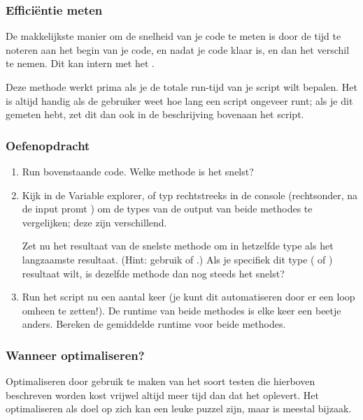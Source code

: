 \documentclass[a4paper,11pt, fleqn]{article}
\begin{document}
\subsubsection{Effici\"entie meten}
De makkelijkste manier om de snelheid van je code te meten is door de tijd te noteren aan het begin van je code, en nadat je code klaar is, en dan het verschil te nemen. Dit kan intern met het .


Deze methode werkt prima als je de totale run-tijd van je script wilt bepalen. Het is altijd handig als de gebruiker weet hoe lang een script ongeveer runt; als je dit gemeten hebt, zet dit dan ook in de beschrijving bovenaan het script.

\subsubsection*{Oefenopdracht}
\begin{enumerate}[label=(\alph*)]
	\item Run bovenstaande code. Welke methode is het snelst?
	\item Kijk in de Variable explorer, of typ  rechtstreeks in de console (rechtsonder, na de input promt ) om de types van de output van beide methodes te vergelijken; deze zijn verschillend.
	
	Zet nu het resultaat van de snelste methode om in hetzelfde type als het langzaamste resultaat. (Hint: gebruik  of .) Als je specifiek dit type ( of ) resultaat wilt, is dezelfde methode dan nog steeds het snelst?
	\item Run het script nu een aantal keer (je kunt dit automatiseren door er een loop omheen te zetten!). De runtime van beide methodes is elke keer een beetje anders. Bereken de gemiddelde runtime voor beide methodes.
\end{enumerate}

\subsubsection{Wanneer optimaliseren?}
Optimaliseren door gebruik te maken van het soort testen die hierboven beschreven worden kost vrijwel altijd meer tijd dan dat het oplevert. Het optimaliseren als doel op zich kan een leuke puzzel zijn, maar is meestal bijzaak.
\end{document}
